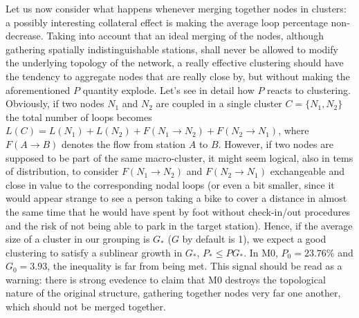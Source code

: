\documentclass[11pt,twoside]{report}
\begin{document}
\begin{itemize}
	Let us now consider what happens whenever merging together nodes in clusters: a possibly interesting collateral effect is making the average loop percentage non-decrease. Taking into account that an ideal merging of the nodes, although gathering spatially indistinguishable stations, shall never be allowed to modify the underlying topology of the network, a really effective clustering should have the tendency to aggregate nodes that are really close by, but without making the aforementioned $ P $ quantity explode. Let's see in detail how $ P $ reacts to clustering. Obviously, if two nodes $ N_1 $ and $ N_2 $ are coupled in a single cluster $ C = \{N_1,N_2\}$ the total number of loops  becomes $ L(C) = L(N_1) + L(N_2) + F(N_1\rightarrow N_2) + F(N_2\rightarrow N_1)$, where $ F(A\rightarrow B) $ denotes the flow from station $ A $ to $ B $. However, if two nodes are supposed to be part of the same macro-cluster, it might seem logical, also in tems of distribution,  to consider $F(N_1\rightarrow N_2)$ and $F(N_2\rightarrow N_1)$ exchangeable and close in value to the corresponding nodal loops (or even a bit smaller, since it would appear strange to see a person taking a bike to cover a distance in almost the same time that he would have spent by foot without check-in/out procedures and the risk of not being able to park in the target station). Hence, if the average size of a cluster in our grouping is $ G_* $ ($ G $ by default is 1), we expect a good clustering to satisfy a sublinear growth in $ G_* $, $ P_*\leq PG_*$. In M0, $ P_0=23.76\% $ and $ G_0= 3.93 $, the inequality is far from being met. This signal should be read as a warning: there is strong evedence to claim that M0 destroys the topological nature of the original structure, gathering together nodes very far one another, which should not be merged together.
	

\end{itemize}
\end{document}
